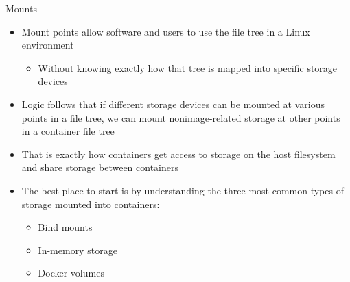 \documentclass[ignorenonframetext,]{beamer}
\providecommand{\tightlist}{%
  \setlength{\itemsep}{0pt}\setlength{\parskip}{0pt}}
\begin{document}
\begin{frame}{Mounts}
\protect\hypertarget{mounts}{}

\begin{itemize}
\tightlist
\item
  Mount points allow software and users to use the file tree in a Linux
  environment

  \begin{itemize}
  \tightlist
  \item
    Without knowing exactly how that tree is mapped into specific
    storage devices
  \end{itemize}
\item
  Logic follows that if different storage devices can be mounted at
  various points in a file tree, we can mount nonimage-related storage
  at other points in a container file tree
\item
  That is exactly how containers get access to storage on the host
  filesystem and share storage between containers
\item
  The best place to start is by understanding the three most common
  types of storage mounted into containers:

  \begin{itemize}
  \tightlist
  \item
    Bind mounts
  \item
    In-memory storage
  \item
    Docker volumes
  \end{itemize}
\end{itemize}

\end{frame}
\end{document}
